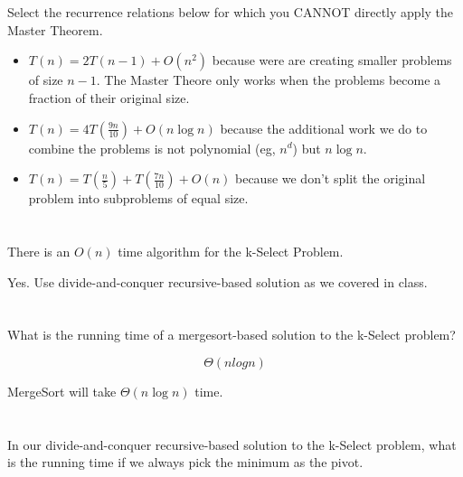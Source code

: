 \documentclass [12pt]{article}
\begin{document}
\section{} Select the recurrence relations below for which you CANNOT directly apply the Master Theorem.

\begin{Solution}
\begin{itemize}
  \item $T(n) = 2T(n-1) + O(n^2)$ because were are creating smaller problems of size $n - 1$. The Master Theore only works when the problems become a fraction of their original size.
  \item $T(n) = 4T\left(\frac{9n}{10}\right) + O(n \log n)$ because the additional work we do to combine the problems is not polynomial (eg, $n^d$) but $n \log n$.
  \item $T(n) = T\left(\frac{n}{5}\right) + T\left(\frac{7n}{10}\right) + O(n)$ because we don't split the original problem into subproblems of equal size.
\end{itemize}
\end{Solution}


\section{} There is an $O(n)$ time algorithm for the k-Select Problem.

\begin{Solution}
Yes. Use divide-and-conquer recursive-based solution as we covered in class.
\end{Solution}


\section{} What is the running time of a mergesort-based solution to the k-Select problem?

\begin{Solution}
$$\Theta(nlogn)$$

MergeSort will take $\Theta(n \log n)$ time.
\end{Solution}


\section{} In our divide-and-conquer recursive-based solution to the k-Select problem, what is the running time if we always pick the minimum as the pivot.
\end{document}

